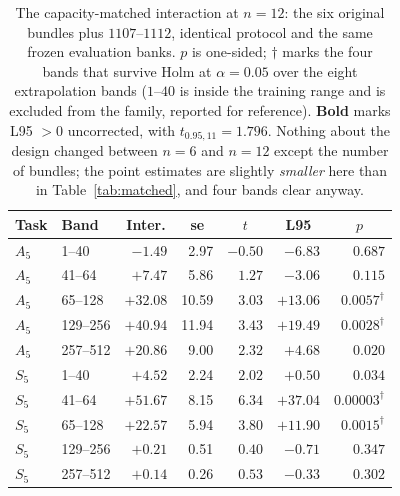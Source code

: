 \documentclass[10pt,twocolumn]{article}
\newcommand{\hd}[1]{\multicolumn{1}{c}{#1}}
\begin{document}
\begin{table}[t]
\centering
\small
\caption{The capacity-matched interaction at $n=12$: the six original bundles
plus $1107$--$1112$, identical protocol and the same frozen evaluation banks.
$p$ is one-sided; $\dagger$ marks the four bands that survive Holm at
$\alpha=0.05$ over the eight extrapolation bands ($1$--$40$ is inside the
training range and is excluded from the family, reported for reference).
\textbf{Bold} marks L95 $>0$ uncorrected, with $t_{0.95,11}=1.796$. Nothing
about the design changed between $n=6$ and $n=12$ except the number of bundles;
the point estimates are slightly \emph{smaller} here than in
Table~\ref{tab:matched}, and four bands clear anyway.}
\label{tab:holm12}
\footnotesize
\setlength{\tabcolsep}{4pt}
\begin{tabular}{llrrrrr}
\toprule
Task & Band & \hd{Inter.} & \hd{se} & \hd{$t$} & \hd{L95} & \hd{$p$} \\
\midrule
$A_5$ & 1--40 & $-1.49$ & 2.97 & $-0.50$ & $-6.83$ & $0.687$ \\
$A_5$ & 41--64 & $+7.47$ & 5.86 & $1.27$ & $-3.06$ & $0.115$ \\
$A_5$ & 65--128 & $\mathbf{+32.08}$ & 10.59 & $3.03$ & $\mathbf{+13.06}$ & $0.0057^\dagger$ \\
$A_5$ & 129--256 & $\mathbf{+40.94}$ & 11.94 & $3.43$ & $\mathbf{+19.49}$ & $0.0028^\dagger$ \\
$A_5$ & 257--512 & $\mathbf{+20.86}$ & 9.00 & $2.32$ & $\mathbf{+4.68}$ & $0.020$ \\
\midrule
$S_5$ & 1--40 & $\mathbf{+4.52}$ & 2.24 & $2.02$ & $\mathbf{+0.50}$ & $0.034$ \\
$S_5$ & 41--64 & $\mathbf{+51.67}$ & 8.15 & $6.34$ & $\mathbf{+37.04}$ & $0.00003^\dagger$ \\
$S_5$ & 65--128 & $\mathbf{+22.57}$ & 5.94 & $3.80$ & $\mathbf{+11.90}$ & $0.0015^\dagger$ \\
$S_5$ & 129--256 & $+0.21$ & 0.51 & $0.40$ & $-0.71$ & $0.347$ \\
$S_5$ & 257--512 & $+0.14$ & 0.26 & $0.53$ & $-0.33$ & $0.302$ \\
\bottomrule
\end{tabular}
\end{table}
\end{document}
